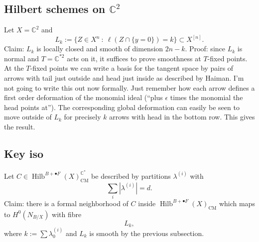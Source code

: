 \documentclass{amsart}
\theoremstyle{definition}
\newcommand{\CC} {\mathbb{C}}          %
\newcommand{\Hilb}{\operatorname{Hilb}}
\newcommand{\CM}{\operatorname{CM}}
\begin{document}
\subsection{Hilbert schemes on $\CC^2$}

Let $X = \CC^2$ and
\[
L_k := \{ Z \in X^{n} \ : \ \ell(Z \cap \{y=0\}) = k \} \subset X^{[n]}.
\]
Claim: $L_k$ is locally closed and smooth of dimension $2n-k$. Proof: since $L_k$ is normal  and $T = \CC^{*2}$ acts on it, it suffices to prove smoothness at $T$-fixed points. At the $T$-fixed points we can write a basis for the tangent space by pairs of arrows with tail just outside and head just inside as described by Haiman. I'm not going to write this out now formally. Just remember how each arrow defines a first order deformation of the monomial ideal (``plus $\epsilon$ times the monomial the head points at''). The corresponding global deformation can easily be seen to move outside of $L_k$ for precisely $k$ arrows with head in the bottom row. This gives the result.   

\subsection{Key iso}

Let $C \in \Hilb^{B+\bullet F}(X)^{\CC^*}_{\CM}$ be described by partitions $\lambda^{(i)}$ with
\[
\sum_i |\lambda^{(i)}| = d.
\]
Claim: there is a formal neighborhood of $C$ inside $\Hilb^{B+\bullet F}(X)_{\CM}$ which maps to $H^0(N_{B/X})$ with fibre
$$
L_{k},
$$
where $k := \sum \lambda_{0}^{(i)}$ and $L_k$ is smooth by the previous subsection. 
\end{document}
